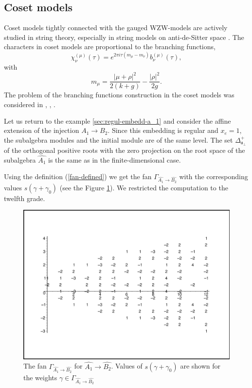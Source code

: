 \documentclass[12pt]{iopart}
\theoremstyle{definition}
\newcommand{\afb}{\mathfrak{a}_{\bot}}
\begin{document}
\subsection{Coset models}
\label{sec:coset-models}

Coset models \cite{Goddard198588} tightly connected with the gauged WZW-models are actively studied
in string theory, especially in string models on anti-de-Sitter space
\cite{Maldacena:2000hw,Maldacena:2000kv,Maldacena:2001km,Maldacena:2001ky,Aharony:1999ti}.
The characters in coset models are proportional to the branching functions,
\begin{equation}
  \label{eq:31}
  \chi^{(\mu)}_{\nu}(\tau)=e^{2\pi i \tau (m_{\mu}-m_{\nu})} b^{(\mu)}_{\nu}(\tau),
\end{equation}
with
\begin{equation*}
  \label{eq:46}
  m_{\mu}=\frac{\left|\mu+\rho\right|^2}{2(k+g)}-\frac{\left|\rho\right|^2}{2g}.
\end{equation*}
The problem of the branching functions construction in the coset models was considered
in  \cite{Dunbar:1992gh}, \cite{Hwang:1994yr}, \cite{lu1994branching}.

Let us return to the example \ref{sec:regul-embedd-a_1} and consider the affine extension of the injection
$A_1 \longrightarrow B_2$.
Since this embedding is regular and $x_e=1$, the subalgebra modules and the initial module are of the same level.
The set $\Delta^{+}_{\afb}$ of the orthogonal positive roots with the zero projection
on the root space of the subalgebra $\hat{A_1}$ is the same as in the finite-dimensional case.

Using the definition (\ref{fan-defined}) we get the fan
$\Gamma_{\hat{A_1} \longrightarrow  \hat{B_2} }$
with the corresponding values $s(\gamma+\gamma_0)$ (see the Figure \ref{fig:AffineB2A1Fan}).
We restricted the computation to the twelfth grade.
\begin{figure}[h!bt]
  \centering
  \includegraphics[width=135mm]{figure10.eps}
  \caption{The fan $\Gamma_{\hat{A_1}\longrightarrow \hat{B_2}}$ for $\hat{A_1}\longrightarrow \hat{B_2}$. Values of  $s(\gamma+\gamma_0)$ are shown for the weights $\gamma\in \Gamma_{\hat{A_1}\longrightarrow \hat{B_2}}$}
  \label{fig:AffineB2A1Fan}
\end{figure}
\end{document}
